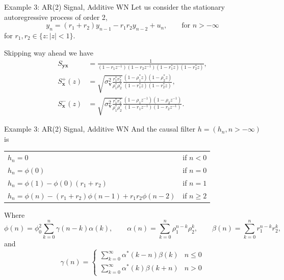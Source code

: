 \documentclass{beamer}  %
\begin{document}
\begin{frame}{Example 3: AR(2) Signal, Additive WN}
	Let us consider the stationary autoregressive process of order 2,
	$$y_n = (r_1+r_2)y_{n-1} - r_1r_2 y_{n-2} + u_n , \qquad \text{for } n > -\infty$$
	for $r_1,r_2 \in \{z : |z|<1\}$.
	
	
	\bigskip
	
	Skipping way ahead we have 
	\begin{align*}
	S_{\textbf{yx}} &= \frac{1}{ (1 - r_1z^{-1})(1 - r_2z^{-1})(1 - r_1^*z)(1 - r_2^*z)},\\
	S^+_{\textbf{x}}(z) &= \sqrt{\sigma_{\textbf{v}}^2\frac{r^*_1r^*_2}{\rho_1^*\rho_2^*}} \frac{(1 - \rho_1^*z)(1 - \rho_2^*z)}{(1 - r_1^*z)(1 - r_2^*z)},\\
	S^-_{\textbf{x}}(z) &= \sqrt{\sigma_{\textbf{v}}^2\frac{r^*_1r^*_2}{\rho_1^*\rho_2^*}} \frac{(1 - \rho_1z^{-1})(1 - \rho_2z^{-1})}{(1 - r_1z^{-1})(1 - r_2z^{-1})}.
	\end{align*}$$
	$$
	
\end{frame}	


\begin{frame}{Example 3: AR(2) Signal, Additive WN}
	And the causal filter $h = (h_n, n > -\infty)$ is 
	\begin{center}
		\bigskip
		\begin{tabular}{l @{\qquad} r}
			$ h_n = 0 $ & if $n<0$ \\
			$ h_n = \phi(0) $ & if $n=0$ \\
			$ h_n = \phi(1) - \phi(0)(r_1+r_2) $ & if $n=1$ \\
			$ h_n = \phi(n) - (r_1+r_2)\phi(n-1) + r_1r_2 \phi(n-2) $ & if $n\ge2$
		\end{tabular}
	\end{center}
Where $$\phi(n) = \phi_0^2 \sum_{k=0}^n \gamma(n-k)\alpha(k),\qquad \alpha(n) = \sum_{k=0}^n \rho_1^{n-k}\rho_2^k,\qquad\beta(n) = \sum_{k=0}^n r_1^{n-k}r_2^k,$$
and $$\gamma(n) = 
\begin{cases}
\displaystyle \sum_{k=0}^\infty \alpha^*(k-n)\beta(k) & n\le 0\\
\displaystyle \sum_{k=0}^\infty \alpha^*(k)\beta(k+n) & n > 0
\end{cases}$$
\end{frame}	

\end{document}
